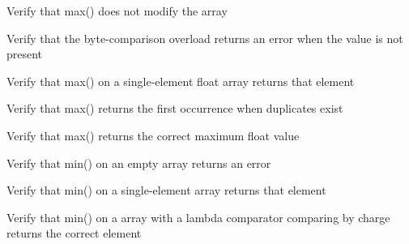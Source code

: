 \begin{DoxyRefList}
%
Verify that max() does not modify the array  
\item[Global \doxylink{test__array_8cpp_a15064299cfac946899c0d9e14d6c620e}{TEST\+\_\+F} (\doxylink{classArrayInitTest}{Array\+Init\+Test}, Contains\+Byte\+Int\+Not\+Found\+Returns\+Error)]\label{test__test000170}%
%
Verify that the byte-\/comparison overload returns an error when the value is not present  
\item[Global \doxylink{test__array_8cpp_a90d6f9bfc59adbb16ab9899bf75f523d}{TEST\+\_\+F} (\doxylink{classArrayInitTest}{Array\+Init\+Test}, Max\+Float\+Single\+Element)]\label{test__test000159}%
%
Verify that max() on a single-\/element float array returns that element  
\item[Global \doxylink{test__array_8cpp_ac0da21dd25f33e5fe93411326dd70b28}{TEST\+\_\+F} (\doxylink{classArrayInitTest}{Array\+Init\+Test}, Max\+Float\+With\+Duplicates\+Returns\+First)]\label{test__test000158}%
%
Verify that max() returns the first occurrence when duplicates exist  
\item[Global \doxylink{test__array_8cpp_a8018c46aed90656b1a8b7de6f5d2a226}{TEST\+\_\+F} (\doxylink{classArrayInitTest}{Array\+Init\+Test}, Max\+Float\+Returns\+Correct\+Value)]\label{test__test000157}%
%
Verify that max() returns the correct maximum float value  
\item[Global \doxylink{test__array_8cpp_aa837e238480bcae3c033e7553bb56404}{TEST\+\_\+F} (\doxylink{classArrayInitTest}{Array\+Init\+Test}, Min\+Particle\+Empty\+Array\+Returns\+Error)]\label{test__test000156}%
%
Verify that min() on an empty  array returns an error  
\item[Global \doxylink{test__array_8cpp_ae74aa4dbc198d5b049b85b74e97603cb}{TEST\+\_\+F} (\doxylink{classArrayInitTest}{Array\+Init\+Test}, Min\+Particle\+Single\+Element)]\label{test__test000155}%
%
Verify that min() on a single-\/element  array returns that element  
\item[Global \doxylink{test__array_8cpp_a861d37f16463b195a28e4ec5202fa716}{TEST\+\_\+F} (\doxylink{classArrayInitTest}{Array\+Init\+Test}, Min\+Particle\+By\+Charge\+With\+Lambda)]\label{test__test000154}%
%
Verify that min() on a  array with a lambda comparator comparing by charge returns the correct element  

\end{DoxyRefList}
